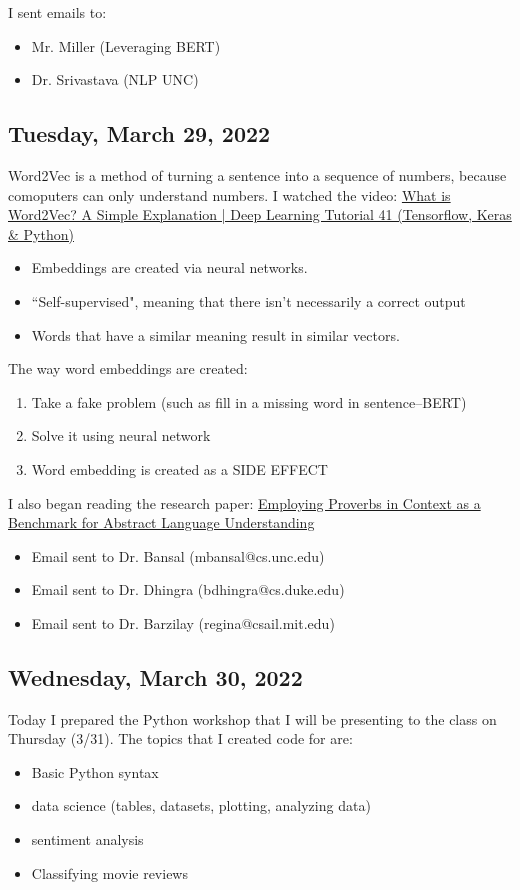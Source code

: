 \documentclass[11pt,letterpaper]{article}
\begin{document}
I sent emails to:
\begin{itemize}
    \item Mr. Miller (Leveraging BERT)
    \item Dr. Srivastava (NLP UNC)
\end{itemize}

\subsection{Tuesday, March 29, 2022}
Word2Vec is a method of turning a sentence into a sequence of numbers, because comoputers can only understand numbers. I watched the video: \href{https://www.youtube.com/watch?v=hQwFeIupNP0}{What is Word2Vec? A Simple Explanation | Deep Learning Tutorial 41 (Tensorflow, Keras & Python)}

\begin{itemize}
    \item Embeddings are created via neural networks.
    \item ``Self-supervised", meaning that there isn't necessarily a correct output
    \item Words that have a similar meaning result in similar vectors.
\end{itemize}

The way word embeddings are created:
\begin{enumerate}
    \item Take a fake problem (such as fill in a missing word in sentence--BERT)
    \item Solve it using neural network
    \item Word embedding is created as a SIDE EFFECT 
\end{enumerate}

I also began reading the research paper: \href{https://arxiv.org/pdf/2109.06838.pdf}{Employing Proverbs in Context as a Benchmark for Abstract
Language Understanding}

\begin{itemize}
    \item Email sent to Dr. Bansal (mbansal@cs.unc.edu)
    \item Email sent to Dr. Dhingra (bdhingra@cs.duke.edu)
    \item Email sent to Dr. Barzilay (regina@csail.mit.edu)
\end{itemize}

\subsection{Wednesday, March 30, 2022}
Today I prepared the Python workshop that I will be presenting to the class on Thursday (3/31). The topics that I created code for are:
\begin{itemize}
    \item Basic Python syntax
    \item data science (tables, datasets, plotting, analyzing data)
    \item sentiment analysis
    \item Classifying movie reviews
\end{itemize}
\end{document}
